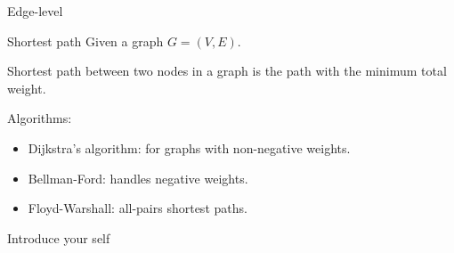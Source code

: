 \documentclass{beamer}
\begin{document}
    \begin{frame}{Edge-level}
        \begin{exampleblock}{Shortest path}
            Given a graph $G = (V, E)$.
            
            Shortest path between two nodes in a graph is the path with the minimum total weight.
                        
        \end{exampleblock}
        \vspace{-2mm}

        Algorithms:
        \begin{itemize}
            \item Dijkstra's algorithm: for graphs with non-negative weights.
            \item Bellman-Ford: handles negative weights.
            \item Floyd-Warshall: all-pairs shortest paths.
        \end{itemize}



        \begin{note}
            {Introduce your self}
        \end{note}
    \end{frame}
\end{document}
